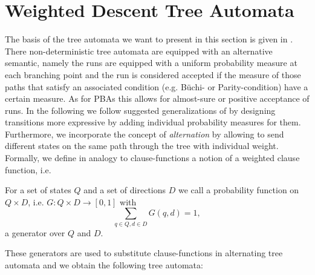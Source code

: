 \section{Weighted Descent Tree Automata}
The basis of the tree automata we want to present in this section is given in
\cite{RandAutoInfTrees}. There non-deterministic tree automata are equipped 
with an alternative semantic, namely the runs are equipped with a uniform 
probability measure at each branching point and the run is considered 
accepted if the measure of those paths that satisfy an associated condition
(e.g. Büchi- or Parity-condition) have a certain measure. As for \acp{PBA} this
allows for almost-sure or positive acceptance of runs. In the following we 
follow suggested generalizations of \cite{RandAutoInfTrees} by designing 
transitions more expressive by adding individual probability measures for them.
Furthermore, we incorporate the concept of \emph{alternation} by allowing to 
send different states on the same path through the tree with individual weight.
Formally, we define in analogy to clause-functions a notion of a weighted 
clause function, i.e.
\begin{definition}[Generator]
  For a set of states $Q$ and a set of directions $D$ we call a probability
  function on $Q\times D$, i.e. $G: Q\times D\rightarrow [0,1]$ with
  \begin{equation*}
    \sum\limits_{q\in Q,d\in D}G(q,d) = 1,
  \end{equation*} 
  a generator over $Q$ and $D$. 
\end{definition}
These generators are used to substitute clause-functions in alternating tree
automata and we obtain the following tree automata:
